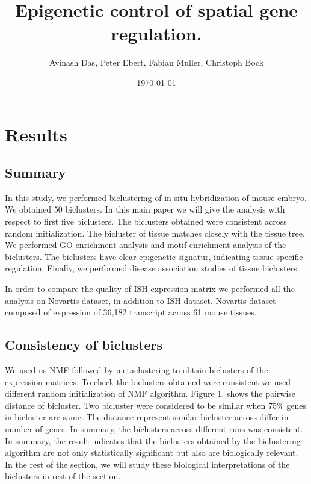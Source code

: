 \documentclass{article}
\title{
Epigenetic control of spatial gene regulation. 
}
\author{Avinash Das, Peter Ebert, Fabian Muller, Christoph Bock}
\date{\today}
\begin{document}
\pagestyle{fancy}

\maketitle
\section{Results}
\subsection{Summary}
In this study, we performed biclustering of in-situ hybridization of mouse embryo. We obtained 50 biclusters. 
In this main paper we will give the analysis with respect to first five biclusters.
The biclusters obtained were consistent across random initialization.
The bicluster of tissue matches closely with the tissue tree. We performed GO enrichment analysis and motif enrichment analysis of the biclusters. The
biclusters have clear epigenetic signatur, indicating tissue specific regulation. Finally, we performed disease association studies of tissue biclusters.

In order to compare the quality of ISH expression matrix we performed all the analysis on Novartis dataset, in addition to ISH dataset. Novartis
dataset composed of expression of 36,182 transcript across 61 mouse tissues. 

\subsection{Consistency of biclusters}
We used ns-NMF followed by metaclustering to obtain biclusters of the expression matrices. 
To check the biclusters obtained were consistent we used different random initialization of NMF algorithm. Figure 1. shows the pairwise distance of 
bicluster. Two bicluster were considered to be similar when 75\% genes in bicluster are same. The distance represent similar bicluster across differ 
in number of genes. In summary, the biclusters across different runs was consistent. 
In summary, the result indicates that the biclusters obtained by the biclustering
algorithm are not only statistically significant but also are biologically relevant. In the rest of the section, we will study these biological 
interpretations of the biclusters in rest of the section. 
\end{document}
